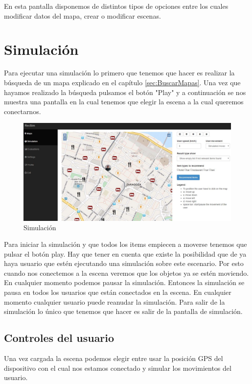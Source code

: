 En esta pantalla disponemos de distintos tipos de opciones entre los cuales modificar datos del mapa, crear o modificar escenas.

\section{Simulación}

Para ejecutar una simulación lo primero que tenemos que hacer es realizar la búsqueda de un mapa explicado en el capítulo \ref{sec:BuscarMapas}. Una vez que hayamos realizado la búsqueda pulsamos el botón "Play" y a continuación se nos muestra una pantalla en la cual tenemos que elegir la escena a la cual queremos conectarnos.

\begin{figure}[H]
	\centering\includegraphics[scale=0.35]{imagenes/capitulo11/capitulo11.jpg}
	\caption{Simulación}
	\label{img:Simulation}
\end{figure}

Para iniciar la simulación y que todos los items empiecen a moverse tenemos que pulsar el botón play. Hay que tener en cuenta que existe la posibilidad que de ya haya usuario que estén ejecutando una simulación sobre este escenario. Por esto cuando nos conectemos a la escena veremos que los objetos ya se estén moviendo. En cualquier momento podemos pausar la simulación. Entonces la simulación se pausa en todos los usuarios que están conectados en la escena. En cualquier momento cualquier usuario puede reanudar la simulación. Para salir de la simulación lo único que tenemos que hacer es salir de la pantalla de simulación.

\subsection{Controles del usuario}

Una vez cargada la escena podemos elegir entre usar la posición GPS del dispositivo con el cual nos estamos conectado y simular los movimientos del usuario.

